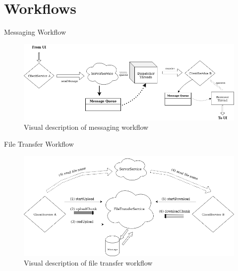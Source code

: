 \documentclass{beamer}
\begin{document}
\section{Workflows}
\begin{frame}{Messaging Workflow}
\begin{figure}[h]
    \includegraphics[scale=0.4]{messageWorkflow}
    \caption{Visual description of messaging workflow}
    \label{fig:diagram1}
\end{figure}
\end{frame}
\begin{frame}{File Transfer Workflow}
\begin{figure}[h]
    \includegraphics[scale=0.35]{FileTransferWorkflow}
    \caption{Visual description of file transfer workflow}
    \label{fig:diagram2}
\end{figure}
\end{frame}
\end{document}
